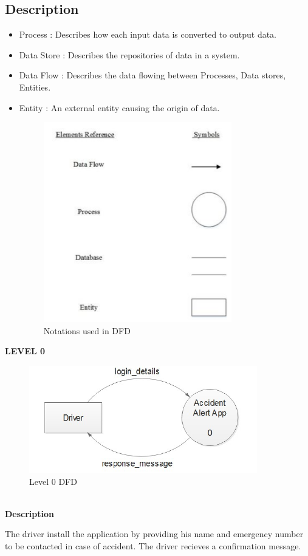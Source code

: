 \documentclass[12pt,a4paper,oneside]{report}
\begin{document}
{\subsection{Description}
\begin{itemize}
\item  Process : Describes how each input data is converted to output data.
\item  Data Store : Describes the repositories of data in a system.
\item   Data Flow : Describes the data ﬂowing between Processes, Data stores, Entities.
\item   Entity : An external entity causing the origin of data.
\begin{figure}[h]
\begin{center}
\includegraphics[scale=1]{dfd.png}
\caption{Notations used in  DFD}
\label{Notations used in  DFD}
\end{center}
\end{figure}
\end{itemize}
\newpage
\textbf{LEVEL 0}
\begin{figure}[h!]
\begin{center}
\includegraphics[scale=.8]{level0.png}
\caption{Level 0 DFD}
\label{Level 0  DFD}
\end{center}
\end{figure}
\\ 
\textbf{Description}
\par The driver install the application by providing his name and emergency number to be contacted in case of accident. The driver recieves a confirmation message. \\

}
\end{document}

